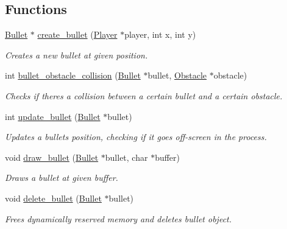 \subsection*{Functions}
\begin{DoxyCompactItemize}
\item 
\hyperlink{struct_bullet}{Bullet} $\ast$ \hyperlink{group__bullet_gaf45d82f5138b8d8b424513cda1236282}{create\+\_\+bullet} (\hyperlink{struct_player}{Player} $\ast$player, int x, int y)
\begin{DoxyCompactList}\small\item\em Creates a new bullet at given position. \end{DoxyCompactList}\item 
int \hyperlink{group__bullet_ga821005fc4046140ee784eafbe32db07a}{bullet\+\_\+obstacle\+\_\+collision} (\hyperlink{struct_bullet}{Bullet} $\ast$bullet, \hyperlink{struct_obstacle}{Obstacle} $\ast$obstacle)
\begin{DoxyCompactList}\small\item\em Checks if there\textquotesingle{}s a collision between a certain bullet and a certain obstacle. \end{DoxyCompactList}\item 
int \hyperlink{group__bullet_ga18a96b8efbc45b8cbc1429f3660bae57}{update\+\_\+bullet} (\hyperlink{struct_bullet}{Bullet} $\ast$bullet)
\begin{DoxyCompactList}\small\item\em Updates a bullet\textquotesingle{}s position, checking if it goes off-\/screen in the process. \end{DoxyCompactList}\item 
void \hyperlink{group__bullet_ga9227bafd4863d90378dbcc48ebf68b93}{draw\+\_\+bullet} (\hyperlink{struct_bullet}{Bullet} $\ast$bullet, char $\ast$buffer)
\begin{DoxyCompactList}\small\item\em Draws a bullet at given buffer. \end{DoxyCompactList}\item 
void \hyperlink{group__bullet_ga715ca6e4284d7f977a09c8d141737e06}{delete\+\_\+bullet} (\hyperlink{struct_bullet}{Bullet} $\ast$bullet)
\begin{DoxyCompactList}\small\item\em Frees dynamically reserved memory and deletes bullet \textquotesingle{}object\textquotesingle{}. \end{DoxyCompactList}\end{DoxyCompactItemize}


